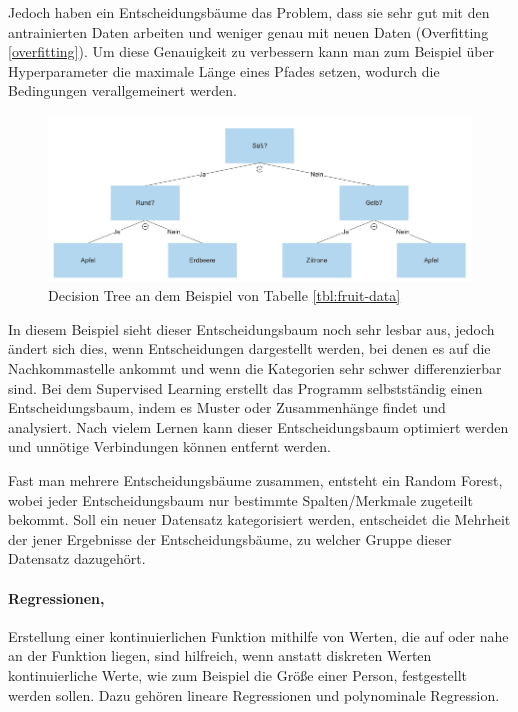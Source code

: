 Jedoch haben ein Entscheidungsbäume das Problem, dass sie sehr gut mit den antrainierten Daten arbeiten und weniger genau mit neuen Daten (Overfitting \ref{overfitting}). Um diese Genauigkeit zu verbessern kann man zum Beispiel über Hyperparameter die maximale Länge eines Pfades setzen, wodurch die Bedingungen verallgemeinert werden.

\begin{figure}[H]
    \centering
    \includegraphics[scale=0.5]{sections/machine-learning/images/decision-tree.png}
    \caption{Decision Tree an dem Beispiel von Tabelle \ref{tbl:fruit-data}}
\end{figure}

In diesem Beispiel sieht dieser Entscheidungsbaum noch sehr lesbar aus, jedoch ändert sich dies, wenn Entscheidungen dargestellt werden, bei denen es auf die Nachkommastelle ankommt und wenn die Kategorien sehr schwer differenzierbar sind. Bei dem Supervised Learning erstellt das Programm selbstständig einen Entscheidungsbaum, indem es Muster oder Zusammenhänge findet und analysiert. Nach vielem Lernen kann dieser Entscheidungsbaum optimiert werden und unnötige Verbindungen können entfernt werden.

Fast man mehrere Entscheidungsbäume zusammen, entsteht ein Random Forest, wobei jeder Entscheidungsbaum nur bestimmte Spalten/Merkmale zugeteilt bekommt. Soll ein neuer Datensatz kategorisiert werden, entscheidet die Mehrheit der jener Ergebnisse der Entscheidungsbäume, zu welcher Gruppe dieser Datensatz dazugehört.

\paragraph{Regressionen,} Erstellung einer kontinuierlichen Funktion mithilfe von Werten, die auf oder nahe an der Funktion liegen, sind hilfreich, wenn anstatt diskreten Werten kontinuierliche Werte, wie zum Beispiel die Größe einer Person, festgestellt werden sollen. Dazu gehören lineare Regressionen und polynominale Regression.

